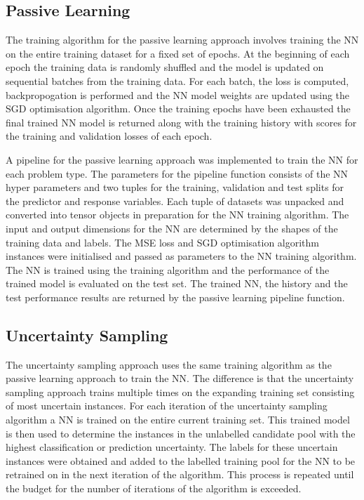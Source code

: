 \documentclass[conference]{IEEEtran}
\begin{document}
	\subsection{Passive Learning}
	The training algorithm for the passive learning approach involves training the NN on the entire training dataset for a fixed set of epochs. At the beginning of each epoch the training data is randomly shuffled and the model is updated on sequential batches from the training data. For each batch, the loss is computed, backpropogation is performed and the NN model weights are updated using the SGD optimisation algorithm. Once the training epochs have been exhausted the final trained NN model is returned along with the training history with scores for the training and validation losses of each epoch.
	
	A pipeline for the passive learning approach was implemented to train the NN for each problem type. The parameters for the pipeline function consists of the NN hyper parameters and two tuples for the training, validation and test splits for the predictor and response variables. Each tuple of datasets was unpacked and converted into tensor objects in preparation for the NN training algorithm. The input and output dimensions for the NN are determined by the shapes of the training data and labels. The MSE loss and SGD optimisation algorithm instances were initialised and passed as parameters to the NN training algorithm. The NN is trained using the training algorithm and the performance of the trained model is evaluated on the test set. The trained NN, the history and the test performance results are returned by the passive learning pipeline function.
	
	\subsection{Uncertainty Sampling}
	The uncertainty sampling approach uses the same training algorithm as the passive learning approach to train the NN. The difference is that the uncertainty sampling approach trains multiple times on the expanding training set consisting of most uncertain instances. For each iteration of the uncertainty sampling algorithm a NN is trained on the entire current training set. This trained model is then used to determine the instances in the unlabelled candidate pool with the highest classification or prediction uncertainty. The labels for these uncertain instances were obtained and added to the labelled training pool for the NN to be retrained on in the next iteration of the algorithm. This process is repeated until the budget for the number of iterations of the algorithm is exceeded. 
	
\end{document}

